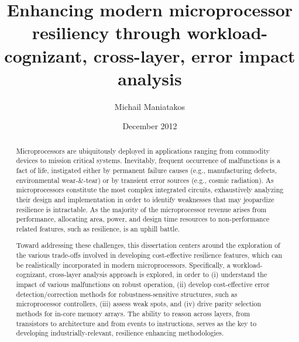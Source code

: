 \documentclass[12pt]{yalephd}
\begin{document}
\author{Michail Maniatakos}
\title{Enhancing modern microprocessor resiliency through workload-cognizant, cross-layer, error impact analysis}
\date{December 2012}

\maketitle

\begin{abstract}

Microprocessors are ubiquitously deployed in applications ranging from commodity devices to mission critical systems. Inevitably, frequent occurrence of malfunctions is a fact of life, instigated either by permanent failure causes (e.g., manufacturing defects, environmental wear-\&-tear) or by transient error sources (e.g., cosmic radiation). As microprocessors constitute the most complex integrated circuits, exhaustively analyzing their design and implementation in order to identify weaknesses that may jeopardize resilience is intractable. As the majority of the microprocessor revenue arises from performance, allocating area, power, and design time resources to non-performance related features, such as resilience, is an uphill battle.

Toward addressing these challenges, this dissertation centers around the exploration of the various trade-offs involved in developing cost-effective resilience features, which can be realistically incorporated in modern microprocessors. Specifically, a workload-cognizant, cross-layer analysis approach is explored, in order to (i) understand the impact of various malfunctions on robust operation, (ii) develop cost-effective error detection/correction methods for robustness-sensitive structures, such as microprocessor controllers, (iii) assess weak spots, and (iv) drive parity selection methods for in-core memory arrays.  The ability to reason across layers, from transistors to architecture and from events to instructions, serves as the key to developing industrially-relevant, resilience enhancing methodologies.

\end{abstract}

\makecopyright

\end{document}
